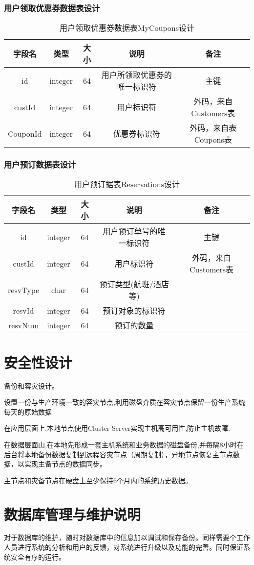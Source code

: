 \subsubsection{用户领取优惠券数据表设计}
\begin{table}[H]
\centering
\caption{用户领取优惠券数据表MyCoupons设计} \label{tab:order-database}
\begin{tabular}{|c|c|c|c|c|}
    \hline
    字段名 & 类型 & 大小 & 说明 & 备注 \\
    \hline
    id & integer & 64 & 用户所领取优惠券的唯一标识符 & 主键\\
    \hline
    custId & integer & 64 & 用户标识符 & 外码，来自Customers表 \\
    \hline
    CouponId & integer & 64 & 优惠券标识符 & 外码，来自表Coupons表\\
    \hline
\end{tabular}
\end{table}


\subsubsection{用户预订数据表设计}
\begin{table}[H]
\centering
\caption{用户预订据表Reservations设计} \label{tab:order-database}
\begin{tabular}{|c|c|c|c|c|}
    \hline
    字段名 & 类型 & 大小 & 说明 & 备注 \\
    \hline
    id & integer & 64 & 用户预订单号的唯一标识符 & 主键\\
    \hline
    custId & integer & 64 & 用户标识符 & 外码，来自Customers表 \\
    \hline
    resvType & char & 64 & 预订类型(航班/酒店等) & \\
    \hline
    resvId & integer & 64 & 预订对象的标识符 & \\
    \hline
    resvNum & integer & 64 & 预订的数量 & \\
    \hline
\end{tabular}
\end{table}


\section{安全性设计}
备份和容灾设计。

设置一份与生产环境一致的容灾节点,利用磁盘介质在容灾节点保留一份生产系统每天的原始数据

在应用层面上,本地节点使用Cluster Server实现主机高可用性,防止主机故障.

在数据层面山,在本地先形成一套主机系统和业务数据的磁盘备份,并每隔8小时在后台将本地备份数据复制到远程容灾节点（周期复制），异地节点恢复主节点数据，以实现主备节点的数据同步。 

主节点和灾备节点在硬盘上至少保持6个月内的系统历史数据。 

\section{数据库管理与维护说明}
对于数据库的维护，随时对数据库中的信息加以调试和保存备份。同样需要个工作人员进行系统的分析和用户的反馈，对系统进行升级以及功能的完善。同时保证系统安全有序的运行。
